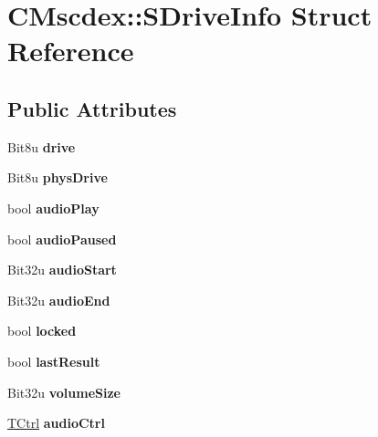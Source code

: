 \hypertarget{structCMscdex_1_1SDriveInfo}{\section{C\-Mscdex\-:\-:S\-Drive\-Info Struct Reference}
\label{structCMscdex_1_1SDriveInfo}
}
\subsection*{Public Attributes}
\begin{DoxyCompactItemize}
\item 
\hypertarget{structCMscdex_1_1SDriveInfo_af931ff198936575b9bdaf8dfa7e6e341}{Bit8u {\bfseries drive}}\label{structCMscdex_1_1SDriveInfo_af931ff198936575b9bdaf8dfa7e6e341}

\item 
\hypertarget{structCMscdex_1_1SDriveInfo_a43149fb7905287e789eb6c458d52024a}{Bit8u {\bfseries phys\-Drive}}\label{structCMscdex_1_1SDriveInfo_a43149fb7905287e789eb6c458d52024a}

\item 
\hypertarget{structCMscdex_1_1SDriveInfo_a630a907f5f71c8e2ce94149f01b83d9c}{bool {\bfseries audio\-Play}}\label{structCMscdex_1_1SDriveInfo_a630a907f5f71c8e2ce94149f01b83d9c}

\item 
\hypertarget{structCMscdex_1_1SDriveInfo_acdc53a1a9549d177e59eb837297c0873}{bool {\bfseries audio\-Paused}}\label{structCMscdex_1_1SDriveInfo_acdc53a1a9549d177e59eb837297c0873}

\item 
\hypertarget{structCMscdex_1_1SDriveInfo_a7c2a67903c9b3c21776cec40732141c2}{Bit32u {\bfseries audio\-Start}}\label{structCMscdex_1_1SDriveInfo_a7c2a67903c9b3c21776cec40732141c2}

\item 
\hypertarget{structCMscdex_1_1SDriveInfo_a7dc4b0f3b9d276b1166ba917a4bf5442}{Bit32u {\bfseries audio\-End}}\label{structCMscdex_1_1SDriveInfo_a7dc4b0f3b9d276b1166ba917a4bf5442}

\item 
\hypertarget{structCMscdex_1_1SDriveInfo_a22ca08609a2775e6ad620a6b91db9a55}{bool {\bfseries locked}}\label{structCMscdex_1_1SDriveInfo_a22ca08609a2775e6ad620a6b91db9a55}

\item 
\hypertarget{structCMscdex_1_1SDriveInfo_a4ba7b9c45d12da484fc0bb6a546f50b6}{bool {\bfseries last\-Result}}\label{structCMscdex_1_1SDriveInfo_a4ba7b9c45d12da484fc0bb6a546f50b6}

\item 
\hypertarget{structCMscdex_1_1SDriveInfo_a922f65110f03b02584229c42e4199e1a}{Bit32u {\bfseries volume\-Size}}\label{structCMscdex_1_1SDriveInfo_a922f65110f03b02584229c42e4199e1a}

\item 
\hypertarget{structCMscdex_1_1SDriveInfo_a48a46b985c5c4303215d09ca59af0813}{\hyperlink{structSCtrl}{T\-Ctrl} {\bfseries audio\-Ctrl}}\label{structCMscdex_1_1SDriveInfo_a48a46b985c5c4303215d09ca59af0813}

\end{DoxyCompactItemize}


